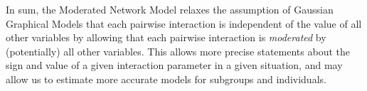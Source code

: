 In sum, the Moderated Network Model relaxes the assumption of Gaussian Graphical Models that each pairwise interaction is independent of the value of all other variables by allowing that each pairwise interaction is \textit{moderated} by (potentially) all other variables. This allows more precise statements about the sign and value of a given interaction parameter in a given situation, and may allow us to estimate more accurate models for subgroups and individuals.